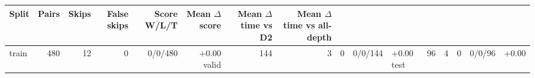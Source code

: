 \begin{tabular}{lrrrrrrr}
\toprule
Split & Pairs & Skips & False skips & Score W/L/T & Mean $\Delta$ score & Mean $\Delta$ time vs D2 & Mean $\Delta$ time vs all-depth \\
\midrule
train & 480 & 12 & 0 & 0/0/480 & +0.00%
valid & 144 & 3 & 0 & 0/0/144 & +0.00%
test & 96 & 4 & 0 & 0/0/96 & +0.00%
\bottomrule
\end{tabular}
